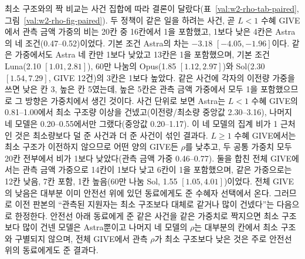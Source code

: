 최소 구조와의 짝 비교는 사건 집합에 따라 결론이 달랐다(표~\ref{val:w2-rho-tab-paired}, 그림~\ref{val:w2-rho-fig-paired}). 두 정책이 같은 일을 하려는 사건, 곧 $L<1$ 수혜 GIVE에서 관측 금액 가중의 비는 20칸 중 16칸에서 1을 포함했고, 1보다 낮은 4칸은 Astra의 네 조건(0.47--0.52)이었다. 기본 조건 Astra의 차는 $-3.18$ $[-4.05, -1.96]$이다. 같은 가중에서도 Astra 네 칸만 1보다 낮았고 13칸은 1을 포함했으며, 기본 조건 Luna(2.10 $[1.01, 2.81]$), 60만 나눔의 Opus(1.85 $[1.12, 2.97]$)와 Sol(2.30 $[1.54, 7.29]$, GIVE 12건)의 3칸은 1보다 높았다. 같은 사건에 각자의 이전량 가중을 쓰면 낮은 칸 3, 높은 칸 5였는데, 높은 5칸은 관측 금액 가중에서 모두 1을 포함했으므로 그 방향은 가중치에서 생긴 것이다. 사건 단위로 보면 Astra는 $L<1$ 수혜 GIVE의 0.81--1.00에서 최소 구조량 이상을 건넸고(이전량/최소량 중앙값 2.30--3.16), 나머지 네 모델은 0.20--0.55에서만 그랬다(중앙값 0.20--1.17). 이 네 모델의 집계 비가 1 근처인 것은 최소량보다 덜 준 사건과 더 준 사건이 섞인 결과다. $L\geq1$ 수혜 GIVE에서는 최소 구조가 이전하지 않으므로 어떤 양의 GIVE든 $\rho$를 낮추고, 두 공통 가중치 모두 20칸 전부에서 비가 1보다 낮았다(관측 금액 가중 0.46--0.77). 둘을 합친 전체 GIVE에서는 관측 금액 가중으로 14칸이 1보다 낮고 6칸이 1을 포함했으며, 같은 가중으로는 12칸 낮음, 7칸 포함, 1칸 높음(60만 나눔 Sol, 1.55 $[1.05, 4.01]$)이었다. 전체 GIVE의 낮음은 대부분 이미 안전선 위에 있던 동료에게도 준 수혜자 선택에서 온다. 그러므로 이전 판본의 ``관측된 지원자는 최소 구조보다 대체로 같거나 많이 건넸다''는 다음으로 한정한다. 안전선 아래 동료에게 준 같은 사건을 같은 가중치로 짝지으면 최소 구조보다 많이 건넨 모델은 Astra뿐이고 나머지 네 모델의 $\rho$는 대부분의 칸에서 최소 구조와 구별되지 않으며, 전체 GIVE에서 관측 $\rho$가 최소 구조보다 낮은 것은 주로 안전선 위의 동료에게도 준 결과다.

